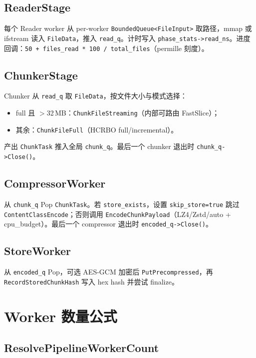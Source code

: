 \subsection{ReaderStage}

每个 Reader worker 从 per-worker \texttt{BoundedQueue<FileInput>} 取路径，mmap 或 ifstream 读入 \texttt{FileData}，推入 \texttt{read\_q}。计时写入 \texttt{phase\_stats->read\_ns}。进度回调：\texttt{50 + files\_read * 100 / total\_files}（permille 刻度）。

\subsection{ChunkerStage}

Chunker 从 \texttt{read\_q} 取 \texttt{FileData}，按文件大小与模式选择：
\begin{itemize}[nosep]
  \item full 且 $>$32\,MB：\texttt{ChunkFileStreaming}（内部可路由 FastSlice）；
  \item 其余：\texttt{ChunkFileFull}（HCRBO full/incremental）。
\end{itemize}
产出 \texttt{ChunkTask} 推入全局 \texttt{chunk\_q}。最后一个 chunker 退出时 \texttt{chunk\_q->Close()}。

\subsection{CompressorWorker}

从 \texttt{chunk\_q} Pop \texttt{ChunkTask}。若 \texttt{store\_exists}，设置 \texttt{skip\_store=true} 跳过 \texttt{ContentClassEncode}；否则调用 \texttt{EncodeChunkPayload}（LZ4/Zstd/auto + cpu\_budget）。最后一个 compressor 退出时 \texttt{encoded\_q->Close()}。

\subsection{StoreWorker}

从 \texttt{encoded\_q} Pop，可选 AES-GCM 加密后 \texttt{PutPrecompressed}，再 \texttt{RecordStoredChunkHash} 写入 hex hash 并尝试 finalize。

\section{Worker 数量公式}

\subsection{ResolvePipelineWorkerCount}

